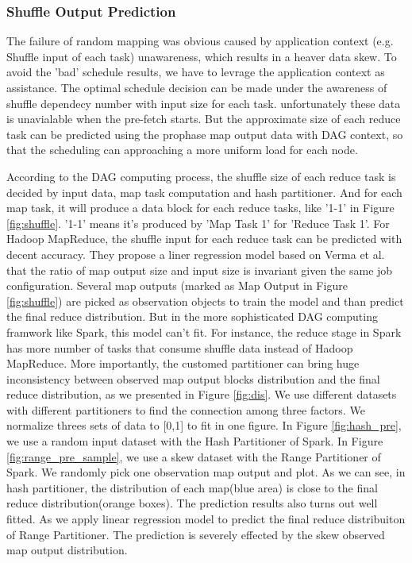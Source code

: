 \documentclass[10pt,twocolumn]{article}
\begin{document}
\subsubsection{Shuffle Output Prediction}\label{shuffleprediction}
The failure of random mapping was obvious caused by application context (e.g. Shuffle input of each task) unawareness, which results in a heaver data skew. To avoid the 'bad' schedule results, we have to levrage the application context as assistance. The optimal schedule decision can be made under the awareness of shuffle dependecy number with input size for each task. unfortunately these data is unavialable when the pre-fetch starts. But the approximate size of each reduce task can be predicted using the prophase map output data with DAG context, so that the scheduling can approaching a more uniform load for each node.

According to the DAG computing process, the shuffle size of each reduce task is decided by input data, map task computation and hash partitioner. And for each map task, it will produce a data block for each reduce tasks, like '1-1' in Figure \ref{fig:shuffle}. '1-1' means it's produced by 'Map Task 1' for 'Reduce Task 1'. For Hadoop MapReduce, the shuffle input for each reduce task can be predicted with decent accuracy\cite{ishuffle}. They propose a liner regression model based on Verma et al.\cite{predict} that the ratio of map output size and input size is invariant given the same job configuration. Several map outputs (marked as Map Output in Figure \ref{fig:shuffle}) are picked as observation objects to train the model and than predict the final reduce distribution. But in the more sophisticated DAG computing framwork like Spark, this model can't fit. For instance, the reduce stage in Spark has more number of tasks that consume shuffle data instead of Hadoop MapReduce. More importantly, the customed partitioner can bring huge inconsistency between observed map output blocks distribution and the final reduce distribution, as we presented in Figure \ref{fig:dis}. We use different datasets with different partitioners to find the connection among three factors. We normalize threes sets of data to [0,1] to fit in one figure. In Figure \ref{fig:hash_pre}, we use a random input dataset with the Hash Partitioner of Spark\cite{sparksource}. In Figure \ref{fig:range_pre_sample}, we use a skew dataset with the Range Partitioner of Spark\cite{sparksource}.
We randomly pick one observation map output and plot. As we can see, in hash partitioner, the distribution of each map(blue area) is close to the final reduce distribution(orange boxes). The prediction results also turns out well fitted. As we apply linear regression model to predict the final reduce distribuiton of Range Partitioner. The prediction is severely effected by the skew observed map output distribution. 
\end{document}
